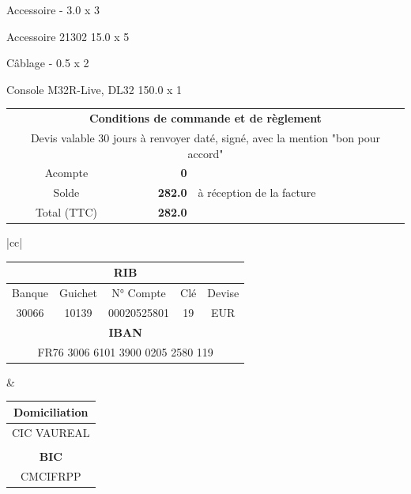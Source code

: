 \documentclass[11pt,french]{article}
\def\Total{282.0}
\def\totalLeft{282.0}
\def\deposit{0}
\begin{document}
Accessoire - 3.0 x 3

Accessoire 21302 15.0 x 5

Câblage - 0.5 x 2

Console M32R-Live, DL32 150.0 x 1

\vfill
\begin{center}
\begin{tabular}{|crl|}
	\hline
	\multicolumn{3}{|c|}{\textbf{Conditions de commande et de règlement}} \\
	\multicolumn{3}{|c|}{Devis valable 30 jours à renvoyer daté, signé, avec la mention "bon pour accord"} \\
	Acompte & \textbf{\deposit \EUR} & \\
	Solde &	\textbf{\Total \EUR} & à réception de la facture \\
	Total (TTC) & \textbf{\totalLeft \EUR} & \\
	\hline
\end{tabular}
\begin{tabular}{|cc|}
	\hline
	\begin{minipage}{10cm}
	\begin{center}
		\begin{tabular}{ccccc}
		 	\multicolumn{5}{c}{\textbf{RIB}} \\
		 	\hline
			Banque & Guichet & N° Compte & Clé & Devise \\
			30066  & 10139 & 00020525801 & 19 & EUR \\ 
			\multicolumn{5}{c}{\textbf{IBAN}} \\
			\hline
			\multicolumn{5}{c}{FR76 3006 6101 3900 0205 2580 119}
		\end{tabular}
	\end{center}
	\end{minipage} &
	\begin{minipage}{7cm}
	\begin{center}
	\begin{tabular}{c}
		\textbf{Domiciliation} \\ \hline
		CIC VAUREAL \\
		\\
		\textbf{BIC} \\ \hline
		CMCIFRPP
	\end{tabular}
	\end{center}
	\end{minipage} \\ \hline \hline


\end{tabular}
\end{center}
\end{document}
